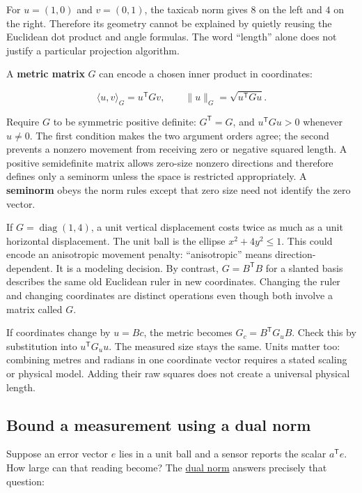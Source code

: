 For \(u=(1,0)\) and \(v=(0,1)\), the taxicab norm gives \(8\) on the left and \(4\) on the right. Therefore its geometry cannot be explained by quietly reusing the Euclidean dot product and angle formulas. The word ``length'' alone does not justify a particular projection algorithm.

A \textbf{metric matrix} \(G\) can encode a chosen inner product in coordinates:

\[
\langle u,v\rangle_G=u^{\mathsf T}Gv,\qquad
\|u\|_G=\sqrt{u^{\mathsf T}Gu}.
\]

Require \(G\) to be symmetric positive definite: \(G^{\mathsf T}=G\), and \(u^{\mathsf T}Gu>0\) whenever \(u\ne0\). The first condition makes the two argument orders agree; the second prevents a nonzero movement from receiving zero or negative squared length. A positive semidefinite matrix allows zero-size nonzero directions and therefore defines only a seminorm unless the space is restricted appropriately. A \textbf{seminorm} obeys the norm rules except that zero size need not identify the zero vector.

If \(G=\operatorname{diag}(1,4)\), a unit vertical displacement costs twice as much as a unit horizontal displacement. The unit ball is the ellipse \(x^2+4y^2\le1\). This could encode an anisotropic movement penalty: ``anisotropic'' means direction-dependent. It is a modeling decision. By contrast, \(G=B^{\mathsf T}B\) for a slanted basis describes the same old Euclidean ruler in new coordinates. Changing the ruler and changing coordinates are distinct operations even though both involve a matrix called \(G\).

If coordinates change by \(u=Bc\), the metric becomes \(G_c=B^{\mathsf T}G_uB\). Check this by substitution into \(u^{\mathsf T}G_uu\). The measured size stays the same. Units matter too: combining metres and radians in one coordinate vector requires a stated scaling or physical model. Adding their raw squares does not create a universal physical length.

\subsection{Bound a measurement using a dual norm}\label{01-foundations-i-ch017-bound-a-measurement-using-a-dual-norm}

Suppose an error vector \(e\) lies in a unit ball and a sensor reports the scalar \(a^{\mathsf T}e\). How large can that reading become? The \hyperref[appendix-d6d9dbbe3c14]{dual norm} answers precisely that question:


